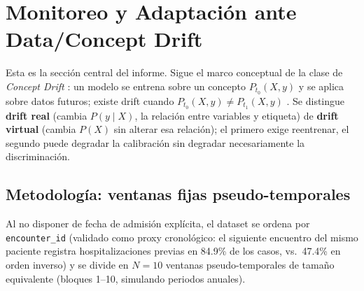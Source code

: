 \documentclass[11pt,a4paper]{article}
\begin{document}
\section{Monitoreo y Adaptación ante Data/Concept Drift}
\label{sec:drift}

Esta es la sección central del informe. Sigue el marco conceptual de la clase de \emph{Concept Drift} \cite{soriano2026}: un modelo se entrena sobre un concepto $P_{t_0}(X,y)$ y se aplica sobre datos futuros; existe drift cuando $P_{t_0}(X,y)\neq P_{t_1}(X,y)$ \cite{gama2014}. Se distingue \textbf{drift real} (cambia $P(y\mid X)$, la relación entre variables y etiqueta) de \textbf{drift virtual} (cambia $P(X)$ sin alterar esa relación); el primero exige reentrenar, el segundo puede degradar la calibración sin degradar necesariamente la discriminación.

\subsection{Metodología: ventanas fijas pseudo-temporales}

Al no disponer de fecha de admisión explícita, el dataset se ordena por \texttt{encounter\_id} (validado como proxy cronológico: el siguiente encuentro del mismo paciente registra hospitalizaciones previas en 84.9\% de los casos, vs.\ 47.4\% en orden inverso) y se divide en $N=10$ ventanas pseudo-temporales de tamaño equivalente (bloques 1--10, simulando periodos anuales).
\end{document}

